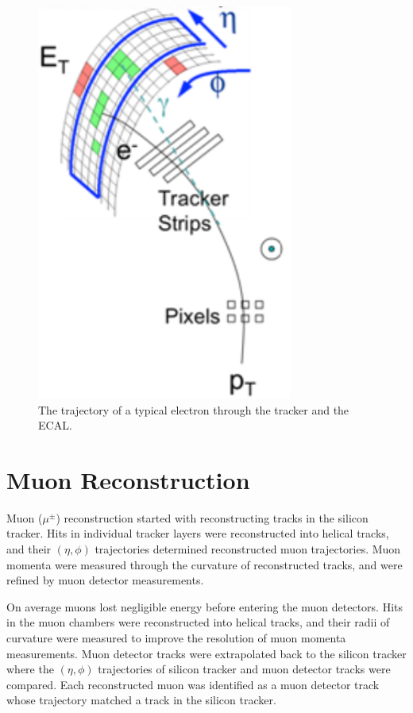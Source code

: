 \begin{figure}[h]
	\centering
	\includegraphics[width=0.75\textwidth]{figures/electronTrackAndSupercluster.png}
	\caption{The trajectory of a typical electron through the tracker and the ECAL.}
	\label{fig:eleTrackAndSC}
\end{figure}


\section{Muon Reconstruction}
\label{sec:muReco}
Muon ($\mu^{\pm}$) reconstruction started with reconstructing tracks in the silicon tracker.  Hits in individual 
tracker layers were reconstructed into helical tracks, and their $(\eta, \phi)$ trajectories determined reconstructed 
muon trajectories.  Muon momenta were measured through the curvature of reconstructed tracks, and were refined by muon 
detector measurements.

On average muons lost negligible energy before entering the muon detectors.  Hits in the muon chambers were reconstructed 
into helical tracks, and their radii of curvature were measured to improve the resolution of muon momenta measurements.  
Muon detector tracks were extrapolated back to the silicon tracker where the $(\eta, \phi)$ trajectories of silicon tracker 
and muon detector tracks were compared.  Each reconstructed muon was identified as a muon detector track whose trajectory 
matched a track in the silicon tracker.

